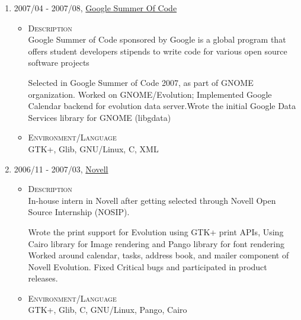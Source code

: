 \documentclass[a4paper,10pt]{article}
\begin{document}
\begin{enumerate}
\begin{itemize}
   \end{itemize}

\item \textsc{2007/04} - \textsc{2007/08}, \href{https://developers.google.com/open-source/gsoc/2007/}{Google Summer Of Code} \\
  \begin {itemize}
  \item \textsc{Description} \\
  Google Summer of Code sponsored by Google is a global program that offers student
  developers stipends to write code for various open source software projects

  Selected in Google Summer of Code 2007, as part of GNOME organization.
  Worked on GNOME/Evolution; Implemented Google Calendar backend for evolution data server.Wrote the initial Google Data Services library for GNOME (libgdata)

\item \textsc{Environment/Language} \\
  GTK+, Glib, GNU/Linux, C, XML  
  \end {itemize}

\item \textsc{2006/11 - 2007/03}, \href{www.novell.com}{Novell} \\
  \begin {itemize}
  \item \textsc{Description} \\
  
  In-house intern in Novell after getting selected through Novell Open Source Internship (NOSIP).
 
  Wrote the print support for Evolution using GTK+ print APIs, Using Cairo library for Image rendering and Pango library for font rendering
  Worked around calendar, tasks, address book, and mailer component of Novell Evolution.
  Fixed Critical bugs and participated in product releases.
\item \textsc{Environment/Language} \\
  GTK+, Glib, C, GNU/Linux, Pango, Cairo
  \end {itemize}
\end{enumerate}

\end{document}
